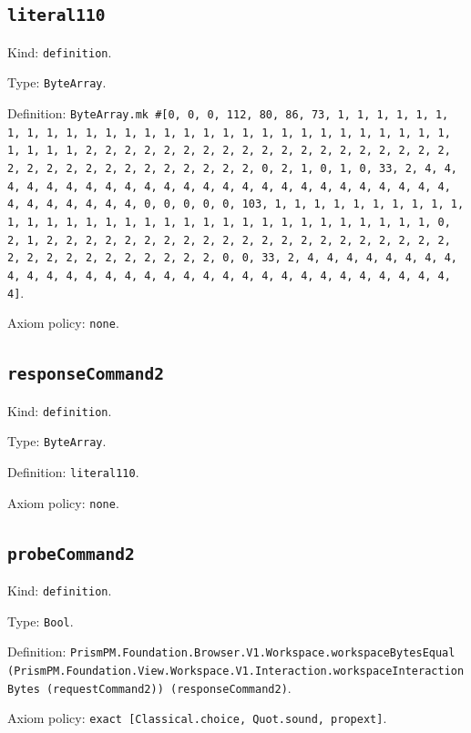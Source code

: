 \documentclass[11pt]{article}
\begin{document}
\subsection*{\texttt{literal110}}
\noindent Kind: \texttt{definition}.\par
\noindent Type: \texttt{ByteArray}.\par
\noindent Definition: \texttt{ByteArray.mk \#[0, 0, 0, 112, 80, 86, 73, 1, 1, 1, 1, 1, 1, 1, 1, 1, 1, 1, 1, 1, 1, 1, 1, 1, 1, 1, 1, 1, 1, 1, 1, 1, 1, 1, 1, 1, 1, 1, 1, 1, 2, 2, 2, 2, 2, 2, 2, 2, 2, 2, 2, 2, 2, 2, 2, 2, 2, 2, 2, 2, 2, 2, 2, 2, 2, 2, 2, 2, 2, 2, 2, 2, 0, 2, 1, 0, 1, 0, 33, 2, 4, 4, 4, 4, 4, 4, 4, 4, 4, 4, 4, 4, 4, 4, 4, 4, 4, 4, 4, 4, 4, 4, 4, 4, 4, 4, 4, 4, 4, 4, 4, 4, 0, 0, 0, 0, 0, 103, 1, 1, 1, 1, 1, 1, 1, 1, 1, 1, 1, 1, 1, 1, 1, 1, 1, 1, 1, 1, 1, 1, 1, 1, 1, 1, 1, 1, 1, 1, 1, 1, 0, 2, 1, 2, 2, 2, 2, 2, 2, 2, 2, 2, 2, 2, 2, 2, 2, 2, 2, 2, 2, 2, 2, 2, 2, 2, 2, 2, 2, 2, 2, 2, 2, 2, 2, 0, 0, 33, 2, 4, 4, 4, 4, 4, 4, 4, 4, 4, 4, 4, 4, 4, 4, 4, 4, 4, 4, 4, 4, 4, 4, 4, 4, 4, 4, 4, 4, 4, 4, 4, 4]}.\par
\noindent Axiom policy: \texttt{none}.\par
\subsection*{\texttt{responseCommand2}}
\noindent Kind: \texttt{definition}.\par
\noindent Type: \texttt{ByteArray}.\par
\noindent Definition: \texttt{literal110}.\par
\noindent Axiom policy: \texttt{none}.\par
\subsection*{\texttt{probeCommand2}}
\noindent Kind: \texttt{definition}.\par
\noindent Type: \texttt{Bool}.\par
\noindent Definition: \texttt{PrismPM.Foundation.Browser.V1.Workspace.workspaceBytesEqual (PrismPM.Foundation.View.Workspace.V1.Interaction.workspaceInteractionBytes (requestCommand2)) (responseCommand2)}.\par
\noindent Axiom policy: \texttt{exact [Classical.choice, Quot.sound, propext]}.\par
\end{document}
